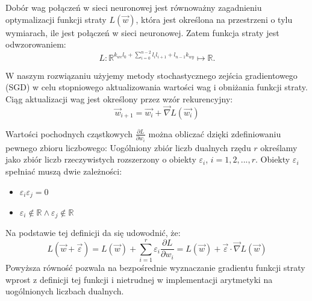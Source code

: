\documentclass{classrep}
\begin{document}
Dobór wag połączeń w sieci neuronowej jest równoważny zagadnieniu optymalizacji funkcji straty $L(\vec{w})$, która jest określona na przestrzeni o tylu wymiarach, ile jest połączeń w sieci neuronowej. Zatem funkcja straty jest odwzorowaniem: $$L: \mathbb{R}^{k_{we} l_0 +\sum_{i=0}^{n-2} l_i l_{i+1} + l_{n-1}k_{wy}} \mapsto \mathbb{R}.$$

W naszym rozwiązaniu użyjemy metody stochastycznego zejścia gradientowego (SGD) w celu stopniowego aktualizowania wartości wag i obniżania funkcji straty.
Ciąg aktualizacji wag jest określony przez wzór rekurencyjny:
$$\vec{w}_{i+1} = \vec{w_i} + \vec{\nabla}L(\vec{w_i})$$ 

Wartości pochodnych cząstkowych $\frac{\partial L}{\partial w_i}$ można obliczać dzięki zdefiniowaniu pewnego zbioru liczbowego:
Uogólniony zbiór liczb dualnych rzędu $r$ określamy jako zbiór liczb rzeczywistych rozszerzony o obiekty $\varepsilon_i$, $i=1,2,...,r.$
Obiekty $\varepsilon_{i}$ spełniać muszą dwie zależności:
    \begin{itemize}
            \item $\varepsilon_{i} \varepsilon_{j} = 0$
	\item  $\varepsilon_{i} \notin \mathbb{R} \land  \varepsilon_{j} \notin \mathbb{R}$ 
      \end{itemize}

Na podstawie tej definicji da się udowodnić, że:
$$L(\vec{w}+\vec{\varepsilon}) = L(\vec{w}) + \sum_{i=1}^{r} \varepsilon_{i} \frac{\partial L}{\partial w_i} = L(\vec{w}) + \vec{\varepsilon} \cdot \vec{\nabla}L(\vec{w})$$
Powyższa równość pozwala na bezpośrednie wyznaczanie gradientu funkcji straty wprost z definicji tej funkcji i nietrudnej w implementacji arytmetyki na uogólnionych liczbach dualnych.
\end{document}
